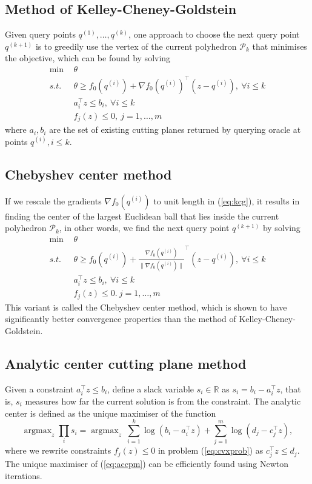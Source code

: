 \documentclass[10pt,a4paper]{article}
\DeclareMathOperator*{\argmax}{argmax}
\newcommand{\eat}[1]{}
\begin{document}
\subsection{Method of Kelley-Cheney-Goldstein}
Given query points $q^{(1)}, \dots, q^{(k)}$, 
one approach to choose the next query point $q^{(k+1)}$ is to greedily use the vertex of the current polyhedron $\mathcal{P}_k$ 
that minimises the objective, which can be found by solving 
\begin{equation}
\label{eq:kcg}
\begin{aligned}
\min   ~& \theta  \\
s.t.~~ ~& \theta \ge f_0(q^{(i)}) + \nabla f_0(q^{(i)})^\top (z - q^{(i)}),  ~\forall i \le k \\
     & a_i^\top z \le b_i,  ~\forall i \le k \\
     & f_j(z) \le 0, ~j = 1, \dots, m
\end{aligned}
\end{equation}
where $a_i, b_i$ are the set of existing cutting planes returned by querying oracle at points $q^{(i)}, i \le k$.


\subsection{Chebyshev center method}
If we rescale the gradients $\nabla f_0(q^{(i)})$ to unit length in (\ref{eq:kcg}), 
it results in finding the center of the largest Euclidean ball that lies inside the current polyhedron $\mathcal{P}_k$,
in other words, we find the next query point $q^{(k+1)}$ by solving
\begin{equation}
\label{eq:chebyshev}
\begin{aligned}
\min   ~& \theta  \\
s.t.~~ ~& \theta \ge f_0(q^{(i)}) + \frac{\nabla f_0(q^{(i)})}{\|\nabla f_0(q^{(i)})\|} ^\top (z - q^{(i)}), ~\forall i \le k \\
     & a_i^\top z \le b_i, ~\forall i \le k \\
     & f_j(z) \le 0. ~j = 1, \dots, m
\end{aligned}
\end{equation}
This variant is called the Chebyshev center method, which is shown to have significantly better convergence properties than the method of Kelley-Cheney-Goldstein.
\eat{citation}


\subsection{Analytic center cutting plane method}
Given a constraint $a_i^\top z \le b_i$, define a slack variable $s_i \in \mathbb{R}$ as $s_i = b_i - a_i^\top z$,
that is, $s_i$ measures how far the current solution is from the constraint.
The analytic center is defined as the unique maximiser of the function
\begin{equation}
\label{eq:accpm}
\argmax_z \prod_i s_i = \argmax_z ~ \sum_{i=1}^k \log(b_i - a_i^\top z) + \sum_{j=1}^m \log(d_j - c_j^\top z),
\end{equation}
where we rewrite constraints $f_j(z) \le 0$ in problem (\ref{eq:cvxprob}) as $c_j^\top z \le d_j$.
The unique maximiser of (\ref{eq:accpm}) can be efficiently found using Newton iterations.
\end{document}
